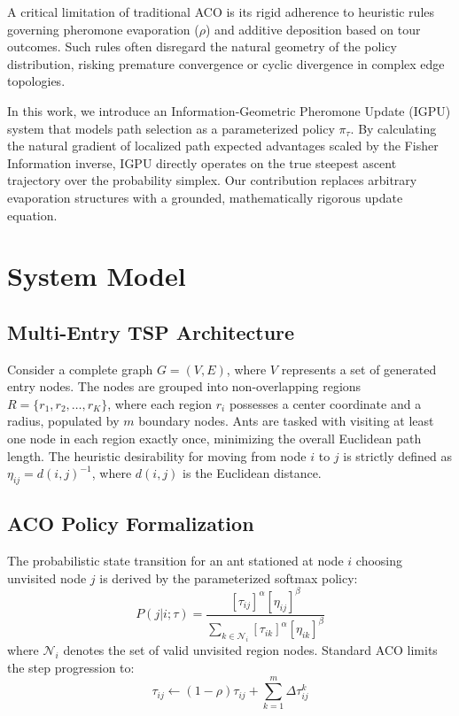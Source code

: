 \documentclass[conference]{IEEEtran}
\begin{document}
A critical limitation of traditional ACO is its rigid adherence to heuristic rules governing pheromone evaporation ($\rho$) and additive deposition based on tour outcomes. Such rules often disregard the natural geometry of the policy distribution, risking premature convergence or cyclic divergence in complex edge topologies.

In this work, we introduce an Information-Geometric Pheromone Update (IGPU) system that models path selection as a parameterized policy $\pi_{\tau}$. By calculating the natural gradient of localized path expected advantages scaled by the Fisher Information inverse, IGPU directly operates on the true steepest ascent trajectory over the probability simplex. Our contribution replaces arbitrary evaporation structures with a grounded, mathematically rigorous update equation.

\section{System Model}
\subsection{Multi-Entry TSP Architecture}
Consider a complete graph $G=(V, E)$, where $V$ represents a set of generated entry nodes. The nodes are grouped into non-overlapping regions $R = \{r_1, r_2, \dots, r_K\}$, where each region $r_i$ possesses a center coordinate and a radius, populated by $m$ boundary nodes. Ants are tasked with visiting at least one node in each region exactly once, minimizing the overall Euclidean path length. The heuristic desirability for moving from node $i$ to $j$ is strictly defined as $\eta_{ij} = d(i,j)^{-1}$, where $d(i,j)$ is the Euclidean distance.

\subsection{ACO Policy Formalization}
The probabilistic state transition for an ant stationed at node $i$ choosing unvisited node $j$ is derived by the parameterized softmax policy:
\begin{equation}
P(j | i;\tau) = \frac{[\tau_{ij}]^\alpha [\eta_{ij}]^\beta}{\sum_{k \in \mathcal{N}_i} [\tau_{ik}]^\alpha [\eta_{ik}]^\beta}
\end{equation}
where $\mathcal{N}_i$ denotes the set of valid unvisited region nodes. Standard ACO limits the step progression to:
\begin{equation}
\tau_{ij} \gets (1 - \rho)\tau_{ij} + \sum_{k=1}^m \Delta\tau_{ij}^k
\end{equation}
\end{document}

